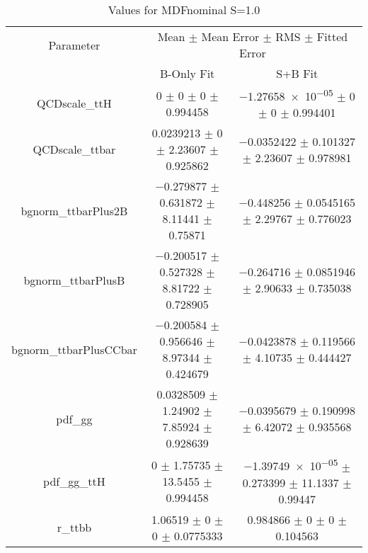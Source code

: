 \begin{table}
\centering
\caption{Values for MDFnominal S=1.0}
\begin{tabular}{ccc}
\toprule
Parameter & \multicolumn{2}{c}{Mean $\pm$ Mean Error $\pm$ RMS $\pm$ Fitted Error}\\
 & B-Only Fit & S+B Fit\\
\midrule
QCDscale\_ttH & \num{0} $\pm$ \num{0} $\pm$ \num{0} $\pm$ \num{0.994458} & \num{-1.27658e-05} $\pm$ \num{0} $\pm$ \num{0} $\pm$ \num{0.994401}\\
QCDscale\_ttbar & \num{0.0239213} $\pm$ \num{0} $\pm$ \num{2.23607} $\pm$ \num{0.925862} & \num{-0.0352422} $\pm$ \num{0.101327} $\pm$ \num{2.23607} $\pm$ \num{0.978981}\\
bgnorm\_ttbarPlus2B & \num{-0.279877} $\pm$ \num{0.631872} $\pm$ \num{8.11441} $\pm$ \num{0.75871} & \num{-0.448256} $\pm$ \num{0.0545165} $\pm$ \num{2.29767} $\pm$ \num{0.776023}\\
bgnorm\_ttbarPlusB & \num{-0.200517} $\pm$ \num{0.527328} $\pm$ \num{8.81722} $\pm$ \num{0.728905} & \num{-0.264716} $\pm$ \num{0.0851946} $\pm$ \num{2.90633} $\pm$ \num{0.735038}\\
bgnorm\_ttbarPlusCCbar & \num{-0.200584} $\pm$ \num{0.956646} $\pm$ \num{8.97344} $\pm$ \num{0.424679} & \num{-0.0423878} $\pm$ \num{0.119566} $\pm$ \num{4.10735} $\pm$ \num{0.444427}\\
pdf\_gg & \num{0.0328509} $\pm$ \num{1.24902} $\pm$ \num{7.85924} $\pm$ \num{0.928639} & \num{-0.0395679} $\pm$ \num{0.190998} $\pm$ \num{6.42072} $\pm$ \num{0.935568}\\
pdf\_gg\_ttH & \num{0} $\pm$ \num{1.75735} $\pm$ \num{13.5455} $\pm$ \num{0.994458} & \num{-1.39749e-05} $\pm$ \num{0.273399} $\pm$ \num{11.1337} $\pm$ \num{0.99447}\\
r\_ttbb & \num{1.06519} $\pm$ \num{0} $\pm$ \num{0} $\pm$ \num{0.0775333} & \num{0.984866} $\pm$ \num{0} $\pm$ \num{0} $\pm$ \num{0.104563}\\
\bottomrule
\end{tabular}
\end{table}